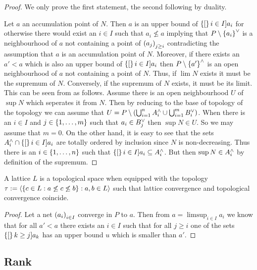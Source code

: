 \documentclass[8pt,a4paper]{article}
\begin{document}
\begin{proof}
    We only prove the first statement, the second following by duality.
    
    Let $a$ an accumulation point of $N$. Then $a$ is an upper bound of $\set[i\in I]{a_i}$ for otherwise there would exist an $i\in I$ such that $a_i\not\leq a$ implying that $P\setminus \set{a_i}^{\join}$ is a neighbourhood of $a$ not containing a point of $\net[j\geq i]{a_j}$ contradicting the assumption that $a$ is an accumulation point of $N$. Moreover, if there exists an $a'<a$ which is also an upper bound of $\set[i\in I]{a_i}$ then $P\setminus\set{a'}^{\meet}$ is an open neighbourhood of $a$ not containing a point of $N$. Thus, if $\lim{N}$ exists it must be the supremum of $N$. Conversely, if the supremum of $N$ exists, it must be its limit. This can be seen from as follows. Assume there is an open neighbourhood $U$ of $\sup{N}$ which seperates it from $N$. Then by reducing to the base of topology of the  topology we can assume that $U=P\setminus(\bigcup_{i=1}^n{A_i^{\wedge}}\cup\bigcup_{i=1}^m{B_i^{\vee}})$. When there is an $i\in I$ and $j\in\set{1,\ldots,m}$ such that $a_i\in B_j^{\vee}$ then $\sup{N}\in U$. So we may assume that $m=0$. On the other hand, it is easy to see that the sets $A_i^{\meet}\setmeet\set[i\in I]{a_i}$ are totally ordered by inclusion since $N$ is non-decreasing. Thus there is an $i\in\set{1,\ldots,n}$ such that $\set[i\in I]{a_i}\setleq A_i^{\meet}$. But then $\sup{N}\in A_i^{\wedge}$ by definition of the supremum.
\end{proof}

\begin{lemma}
    A lattice $L$ is a topological space when equipped with the topology
    $\tau:=\gen{\set{c\in L: a\not\leq c\not\leq b}:a,b\in L}$ such that lattice convergence and topological convergence coincide.
\end{lemma}

\begin{proof}
    Let a net $\net[i\in I]{a_i}$ converge in $P$ to $a$. Then from $a=\limsup_{i\in I}{a_i}$ we know that for all $a'<a$ there exists an $i\in I$ such that for all $j\geq i$ one of the sets $\set[k\geq j]{a_k}$ has an upper bound $u$ which is smaller than $a'$.
\end{proof}



\subsection{Rank}
\end{document}
